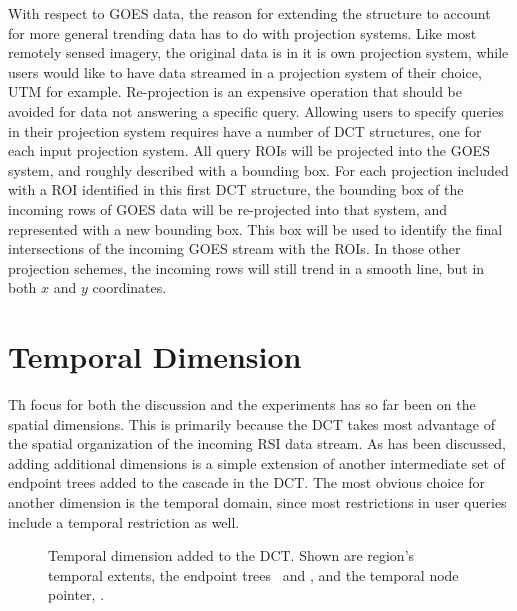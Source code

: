 \documentclass{ucdthesis}       %
\begin{document}
With respect to \ac{GOES} data, the reason for extending the structure
to account for more general trending data has to do with projection
systems.  Like most remotely sensed imagery, the original data is in
it is own projection system, while users would like to have data
streamed in a projection system of their choice, \ac{UTM} for example.
Re-projection is an expensive operation that should be avoided for
data not answering a specific query.  Allowing users to
specify queries in their projection system requires have a number of
\ac{DCT} structures, one for each input projection system.  All query
\acp{ROI} will be projected into the \ac{GOES} system, and roughly
described with a bounding box.  For each projection included with a
\ac{ROI} identified in this first \ac{DCT} structure, the bounding box of
the incoming rows of \ac{GOES} data will be re-projected into that
system, and represented with a new bounding box.  This box will be
used to identify the final intersections of the incoming \ac{GOES}
stream with the \acp{ROI}.  In those other projection
schemes, the incoming rows will still trend in a smooth line, but in
both $x$ and $y$ coordinates.


\section{Temporal Dimension}
\label{sec:temporal}

Th focus for both the discussion and the experiments has so far been
on the spatial dimensions.  This is primarily because the \ac{DCT} takes
most advantage of the spatial organization of the incoming \ac{RSI}
data stream.  As has been discussed, adding additional dimensions is a
simple extension of another intermediate set of endpoint trees added
to the cascade in the \ac{DCT}.  The most obvious choice for another
dimension is the temporal domain, since most restrictions in user
queries include a temporal restriction as well.

\begin{figure}[htb]
  \centering
  
  \caption[\ac{DCT} temporal dimension]{%
    Temporal dimension added to the \ac{DCT}.  Shown
    are region's temporal extents, the endpoint trees \Tn\ and \Tx,
    and the temporal node pointer, \wt.}
  \label{fig:temporal}
\end{figure}
\end{document}
